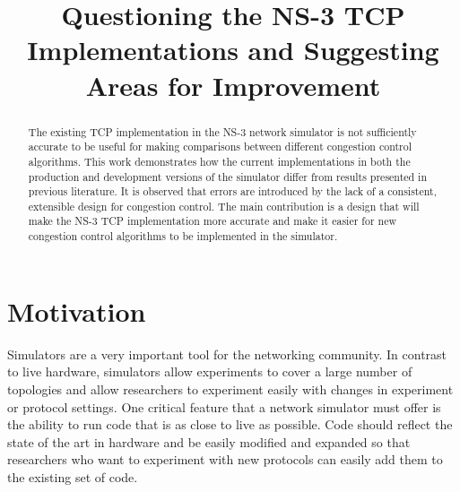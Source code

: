\documentclass[conference]{IEEEtran}
\begin{document}
\title{Questioning the NS-3 TCP Implementations and Suggesting Areas for Improvement}

\author{
\and
{}
}

\maketitle

\begin{abstract}
The existing TCP implementation in the NS-3 network simulator is not sufficiently accurate to be useful for making comparisons between different congestion control algorithms. This work demonstrates how the current implementations in both the production and development versions of the simulator differ from results presented in previous literature. It is observed that errors are introduced by the lack of a consistent, extensible design for congestion control. The main contribution is a design that will make the NS-3 TCP implementation more accurate and make it easier for new congestion control algorithms to be implemented in the simulator.  
\end{abstract}

\section{Motivation}
Simulators are a very important tool for the networking community. In contrast to live hardware, simulators allow experiments to cover a large number of topologies and allow researchers to experiment easily with changes in experiment or protocol settings. One critical feature that a network simulator must offer is the ability to run code that is as close to live as possible. Code should reflect the state of the art in hardware and be easily modified and expanded so that researchers who want to experiment with new protocols can easily add them to the existing set of code. 
\end{document}
